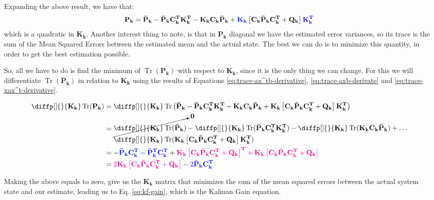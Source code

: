 \documentclass[12pt]{article}
\newcommand{\mat}[1]{\boldsymbol{\mathbf{#1}}}
\newcommand{\matT}[1]{\boldsymbol{\mathbf{#1^T}}}
\newcommand{\brac}[1]{\left[#1\right]} %
\newcommand{\parentheses}[1]{\left(#1\right)}
\DeclareMathOperator{\Tr}{Tr}
\newcommand{\blue}[1]{\color{blue}#1\color{black}}
\newcommand{\magenta}[1]{\color{magenta}#1\color{black}}
\begin{document}
Expanding the above result, we have that:
\begin{equation*}
    \mat{P_k} = \mat{\bar{P}_k} - \mat{\bar{P}_k}\matT{C_k}\matT{K_k} - \mat{K_k C_k \bar{P}_k} +  \blue{\mat{K_k}}\brac{\mat{C_k}\mat{\bar{P}_k}\matT{C_k} + \mat{Q_k}}\blue{\matT{K_k}}
\end{equation*}
which is a quadratic in $\mat{K_k}$. Another interest thing to note, is that in $\mat{P_k}$ diagonal we have the estimated error variances, so its trace is the sum of the Mean Squared Errors between the estimated mean and the actual state. The best we can do is to minimize this quantity, in order to get the best estimation possible. 

So, all we have to do is find the minimum of $\Tr(\mat{P_k})$ with respect to $\mat{K_k}$, since it is the only thing we can change. For this we will differentiate $\Tr(\mat{P_k})$ in relation to $\mat{K_k}$ using the results of Equations \ref{eq:trace-ax^tb-derivative}, \ref{eq:trace-axb-derivate} and \ref{eq:trace-xax^t-derivative}.

\begin{equation}
   \begin{aligned}
       \diffp[]{}{\mat{K_k}}\Tr(\mat{P_k}) &= \diffp[]{}{\mat{K_k}} \Tr\parentheses{\mat{\bar{P}_k} - \mat{\bar{P}_k}\matT{C_k}\matT{K_k} - \mat{K_k C_k \bar{P}_k} +  \mat{K_k}\brac{\mat{C_k}\mat{\bar{P}_k}\matT{C_k} + \mat{Q_k}}\matT{K_k}}\\
       &= \begin{aligned}
       &\cancelto{\mat{0}}{\diffp[]{}{\mat{K_k}} \Tr(\mat{\bar{P}_k})} - \diffp[]{}{\mat{K_k}}\Tr(\mat{\bar{P}_k}\matT{C_k}\matT{K_k}) - \diffp[]{}{\mat{K_k}}\Tr(\mat{K_k C_k \bar{P}_k}) + \dots\\ &\diffp[]{}{\mat{K_k}}\Tr(\mat{K_k}\brac{\mat{C_k}\mat{\bar{P}_k}\matT{C_k} + \mat{Q_k}}\matT{K_k})
       \end{aligned}\\
       &= -\blue{\mat{\bar{P}_k}\matT{C_k} - \matT{\bar{P}_k}\matT{C_k}} + \magenta{\mat{K_k}\brac{\mat{C_k}\mat{\bar{P}_k}\matT{C_k} + \mat{Q_k}}^\mathbf{T} + \mat{K_k}\brac{\mat{C_k}\mat{\bar{P}_k}\matT{C_k} + \mat{Q_k}}}\\
       &= \magenta{2 \mat{K_k}\brac{\mat{C_k}\mat{\bar{P}_k}\matT{C_k} + \mat{Q_k}}} - \blue{2 \mat{\bar{P}_k}\matT{C_k}}
   \end{aligned} 
   \label{eq:kf-gain-calc}
\end{equation}

Making the above equals to zero, give us the $\mat{K_k}$ matrix that minimizes the sum of the mean squared errors between the actual system state and our estimate, leading us to Eq. \ref{eq:kf-gain}, which is the Kalman Gain equation.
\end{document}
